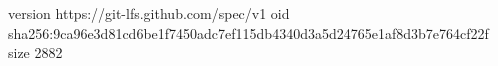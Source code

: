 version https://git-lfs.github.com/spec/v1
oid sha256:9ca96e3d81cd6be1f7450adc7ef115db4340d3a5d24765e1af8d3b7e764cf22f
size 2882
